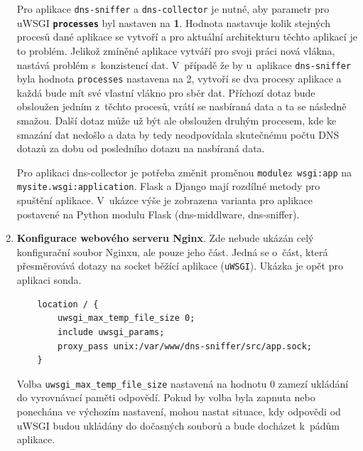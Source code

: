 \documentclass[thesis=M,czech]{src/FITthesis}[2019/12/23]
\begin{document}
\begin{enumerate}
	Pro aplikace \texttt{dns-sniffer} a \texttt{dns-collector} je nutné, aby parametr pro uWSGI \textbf{\texttt{processes}} byl nastaven na \textbf{1}. Hodnota nastavuje kolik stejných procesů dané aplikace se vytvoří a pro aktuální architekturu těchto aplikací je to problém. Jelikož zmíněné aplikace vytváří pro svoji práci nová vlákna, nastává problém s~konzistencí dat. V~případě že by u~aplikace \texttt{dns-sniffer} byla hodnota \texttt{processes} nastavena na 2, vytvoří se dva procesy aplikace a každá bude mít své vlastní vlákno pro sběr dat. Příchozí dotaz bude obsloužen jedním z~těchto procesů, vrátí se nasbíraná data a ta se následně smažou. Další dotaz může už být ale obsloužen druhým procesem, kde ke smazání dat nedošlo a data by tedy neodpovídala skutečnému počtu DNS dotazů za dobu od posledního dotazu na nasbíraná data. 
 
 	Pro aplikaci dns-collector je potřeba změnit proměnou \texttt{module}\linebreak z~\texttt{wsgi:app} na \texttt{mysite.wsgi:application}. Flask a Django mají rozdílné metody pro spuštění aplikace. V~ukázce výše je zobrazena varianta pro aplikace postavené na Python modulu Flask (dns-middlware, dns-sniffer). 
 

	\item \textbf{Konfigurace webového serveru Nginx}. Zde nebude ukázán celý konfigurační soubor Nginxu, ale pouze jeho část. Jedná se o~část, která přesměrovává dotazy na socket běžící aplikace (\texttt{uWSGI}). Ukázka je opět pro aplikaci sonda. 
	 \begin{verbatim}
	location / { 
		uwsgi_max_temp_file_size 0;
    	include uwsgi_params;
    	proxy_pass unix:/var/www/dns-sniffer/src/app.sock;
	}
	\end{verbatim}
	
	Volba \texttt{uwsgi\_max\_temp\_file\_size} nastavená na hodnotu 0 zamezí \linebreak ukládání do vyrovnávací paměti odpovědí. Pokud by volba byla zapnuta nebo ponechána ve výchozím nastavení, mohou nastat situace, kdy odpovědi od uWSGI budou ukládány do dočasných souborů a bude docházet k~pádům aplikace. 
	

\end{enumerate}
\end{document}
